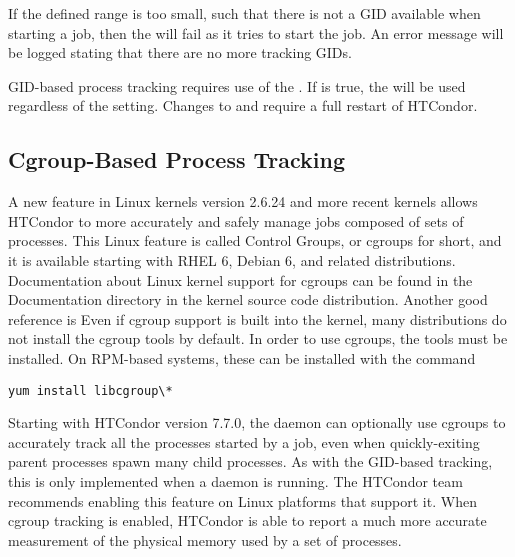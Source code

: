 If the defined range is too small, such that there is not a GID available
when starting a job,
then the  will fail as it tries to start the job.
An error message will be logged stating that there are no more tracking GIDs.

GID-based process tracking requires use of the . If
 is true, the  will
be used regardless of the  setting.  Changes to
 and  require
a full restart of HTCondor.

\subsection{\label{sec:CGroupTracking}Cgroup-Based Process Tracking} 

A new feature in Linux kernels version 2.6.24 and more recent kernels
allows HTCondor to
more accurately and safely manage jobs composed of sets of processes.
This Linux feature is called Control Groups, or cgroups for short, and 
it is available starting with RHEL 6, Debian 6, and related distributions.  
Documentation about Linux kernel support for cgroups can be found in
the Documentation directory in the kernel source code distribution.
Another good reference is 
Even if cgroup support is built into the kernel, 
many distributions do not install the cgroup tools by default.
In order to use cgroups, 
the tools must be installed.  
On RPM-based systems, these can be installed with the command

\begin{verbatim}
yum install libcgroup\*
\end{verbatim}

Starting with HTCondor version 7.7.0, 
the  daemon can optionally use cgroups
to accurately track all the processes started by a job, 
even when quickly-exiting parent processes spawn many child processes.
As with the GID-based tracking, 
this is only implemented when a  daemon is running.
The HTCondor team recommends enabling this feature on Linux platforms 
that support it.
When cgroup tracking is enabled, 
HTCondor is able to report a much more accurate
measurement of the physical memory used by a set of processes.

